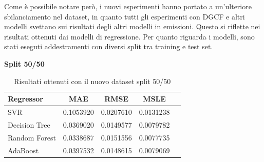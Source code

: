 \noindent Come è possibile notare però, i nuovi esperimenti hanno portato a un'ulteriore sbilanciamento nel dataset, in quanto tutti gli esperimenti con DGCF e altri modelli svettano sui risultati degli altri modelli in emissioni.
Questo si riflette nei risultati ottenuti dai modelli di regressione. Per quanto riguarda i modelli,
sono stati eseguti addestramenti con diversi split tra training e test set.


\noindent\textbf{Split 50/50}

\begin{table}[H]
    \centering
    \begin{tabular}{|>{\centering\arraybackslash}m{5cm}|c|c|c|c|}
        \hline
        \textbf{Regressor} & \textbf{MAE} & \textbf{RMSE} & \textbf{MSLE} \\ [10pt]
        \hline
        SVR & 0.1053920 & 0.0207610 & 0.0131238 \\ [10pt]
        \hline
        Decision Tree & 0.0369020 & 0.0149577 & 0.0079782 \\ [10pt]
        \hline
        Random Forest & 0.0338687 & 0.0151556 & 0.0077735 \\ [10pt]
        \hline
        AdaBoost & 0.0397532 & 0.0148615 & 0.0079069 \\ [10pt]
        \hline
    \end{tabular}
    \caption{Risultati ottenuti con il nuovo dataset split 50/50}
    \label{tab:results}
\end{table}

